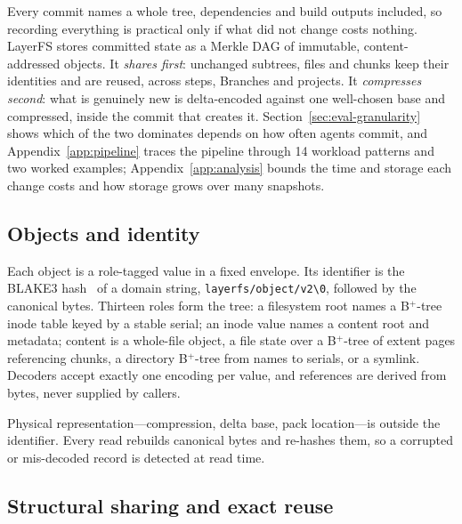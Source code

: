 \documentclass[letterpaper,twocolumn,10pt]{article}
\newcommand{\sys}{LayerFS}
\begin{document}
Every commit names a whole tree, dependencies and build outputs included,
so recording everything is practical only if what did not change costs
nothing. \sys{} stores committed state as a Merkle DAG of immutable,
content-addressed objects. It \emph{shares first}: unchanged subtrees,
files and chunks keep their identities and are reused, across steps,
Branches and projects. It \emph{compresses second}: what is genuinely new
is delta-encoded against one well-chosen base and compressed, inside the
commit that creates it. Section~\ref{sec:eval-granularity} shows which of
the two dominates depends on how often agents commit, and
Appendix~\ref{app:pipeline} traces the pipeline through 14 workload
patterns and two worked examples; Appendix~\ref{app:analysis} bounds the
time and storage each change costs and how storage grows over many
snapshots.

\subsection{Objects and identity}

Each object is a role-tagged value in a fixed envelope. Its identifier is
the BLAKE3 hash~\cite{blake3} of a domain string,
\texttt{layerfs/object/v2\textbackslash 0}, followed by the canonical
bytes. Thirteen roles form the tree: a
filesystem root names a B$^+$-tree inode table keyed by a stable serial; an
inode value names a content root and metadata; content is a whole-file
object, a file state over a B$^+$-tree of extent pages referencing chunks,
a directory B$^+$-tree from names to serials, or a symlink. Decoders accept
exactly one encoding per value, and references are derived from bytes,
never supplied by callers.

Physical representation---compression, delta base, pack location---is
outside the identifier. Every read rebuilds canonical bytes and re-hashes
them, so a corrupted or mis-decoded record is detected at read time.

\subsection{Structural sharing and exact reuse}
\label{sec:reuse}
\end{document}
